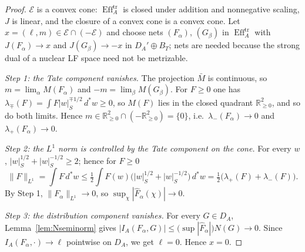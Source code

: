 \documentclass[11pt]{amsart}
\theoremstyle{definition}
\theoremstyle{remark}
\newcommand{\R}{\mathbb R}
\newcommand{\dstar}{\,d^{*}}
\newcommand{\Eff}{\operatorname{Eff}}
\newcommand{\DA}{D_A}
\newcommand{\BT}{B_T}
\begin{document}
\begin{proof}
$\mathcal E$ is a convex cone: $\Eff_A^{\mathrm{tr}}$ is closed under addition
and nonnegative scaling, $J$ is linear, and the closure of a convex cone is a
convex cone.  Let $x=(\ell,m)\in\mathcal E\cap(-\mathcal E)$ and choose nets
$(F_{\alpha})$, $(G_{\beta})$ in $\Eff_A^{\mathrm{tr}}$ with $J(F_{\alpha})\to
x$ and $J(G_{\beta})\to-x$ in $\DA'\oplus\BT$; nets are needed because the
strong dual of a nuclear LF space need not be metrizable.

\emph{Step 1: the Tate component vanishes.}  The projection $\bar M$ is
continuous, so $m=\lim_{\alpha}M(F_{\alpha})$ and
$-m=\lim_{\beta}M(G_{\beta})$.  For $F\ge0$ one has
$\lambda_{\mp}(F)=\int F|w|_S^{\mp1/2}\dstar w\ge0$, so $M(F)$ lies in the
closed quadrant $\R_{\ge0}^{2}$, and so do both limits.  Hence
$m\in\R_{\ge0}^{2}\cap(-\R_{\ge0}^{2})=\{0\}$, i.e.\ $\lambda_-(F_{\alpha})\to0$
and $\lambda_+(F_{\alpha})\to0$.

\emph{Step 2: the $L^{1}$ norm is controlled by the Tate component on the
cone.}  For every $w$, $|w|_S^{1/2}+|w|_S^{-1/2}\ge2$; hence for $F\ge0$
\begin{equation}\label{eq:amgm}
\lVert F\rVert_{L^{1}}=\int F\dstar w\le\tfrac12\int
F(w)\bigl(|w|_S^{1/2}+|w|_S^{-1/2}\bigr)\dstar w
=\tfrac12\bigl(\lambda_+(F)+\lambda_-(F)\bigr).
\end{equation}
By Step 1, $\lVert F_{\alpha}\rVert_{L^{1}}\to0$, so
$\sup_{\chi}|\widehat F_{\alpha}(\chi)|\to0$.

\emph{Step 3: the distribution component vanishes.}  For every $G\in\DA$,
Lemma~\ref{lem:Nseminorm} gives $|I_A(F_{\alpha},G)|\le
\bigl(\sup|\widehat F_{\alpha}|\bigr)N(G)\to0$.  Since $I_A(F_{\alpha},\cdot)
\to\ell$ pointwise on $\DA$, we get $\ell=0$.  Hence $x=0$.
\end{proof}
\end{document}

